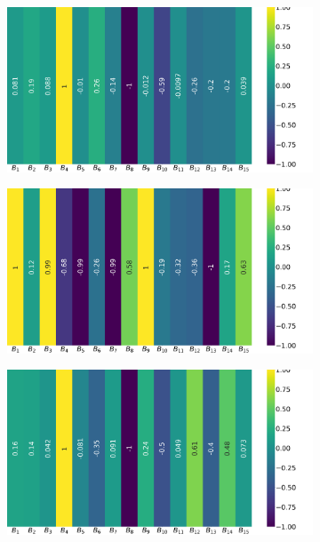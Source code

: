 \begin{figure}[!ht]
	\centering
	\begin{subfigure}{0.49\linewidth}
		\includegraphics[width=\linewidth]{img/qlp_corr/Bn_coil0.png}
	\end{subfigure}
	\begin{subfigure}{0.49\linewidth}
		\includegraphics[width=\linewidth]{img/qlp_corr/Bn_coil1.png}
	\end{subfigure}
	\begin{subfigure}{0.49\linewidth}
		\includegraphics[width=\linewidth]{img/qlp_corr/Bn_coil2.png}

\end{subfigure}
\end{figure}
